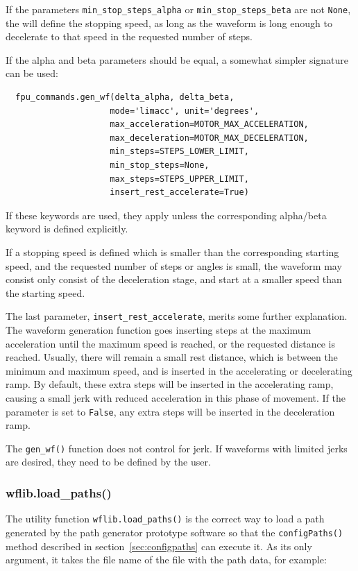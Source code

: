 \documentclass[11pt,a4paper]{report}
\begin{document}
If the parameters \texttt{min\_stop\_steps\_alpha} or
\texttt{min\_stop\_steps\_beta} are not \texttt{None}, the will define
the stopping speed, as long as the waveform is long enough to
decelerate to that speed in the requested number of steps.

If the alpha and beta parameters should be equal, a somewhat
simpler signature can be used:

\begin{verbatim}
  fpu_commands.gen_wf(delta_alpha, delta_beta,
                     mode='limacc', unit='degrees',
                     max_acceleration=MOTOR_MAX_ACCELERATION,
                     max_deceleration=MOTOR_MAX_DECELERATION,
                     min_steps=STEPS_LOWER_LIMIT,
                     min_stop_steps=None,
                     max_steps=STEPS_UPPER_LIMIT,
                     insert_rest_accelerate=True)
\end{verbatim}

If these keywords are used, they apply unless the corresponding
alpha/beta keyword is defined explicitly.

If a stopping speed is defined which is smaller than the corresponding
starting speed, and the requested number of steps or angles is small,
the waveform may consist only consist of the deceleration stage, and
start at a smaller speed than the starting speed.



The last parameter, \texttt{insert\_rest\_accelerate}, merits some
further explanation. The waveform generation function goes inserting
steps at the maximum acceleration until the maximum speed is reached,
or the requested distance is reached. Usually, there will remain a
small rest distance, which is between the minimum and maximum speed,
and is inserted in the accelerating or decelerating ramp.  By default,
these extra steps will be inserted in the accelerating ramp, causing a
small jerk with reduced acceleration in this phase of movement. If the
parameter is set to \texttt{False}, any extra steps will be inserted in
the deceleration ramp.

The \texttt{gen\_wf()} function does not control for jerk. If
waveforms with limited jerks are desired, they need to be defined by
the user.




\subsubsection{wflib.load\_paths()}
%
%
%
%
The utility function \texttt{wflib.load\_paths()} is the correct way
to load a path generated by the path generator prototype software so
that the \texttt{configPaths()} method described in
section~\ref{sec:configpaths} can execute it. As its only
argument, it takes the file name of the file with the path
data, for example:
\end{document}
